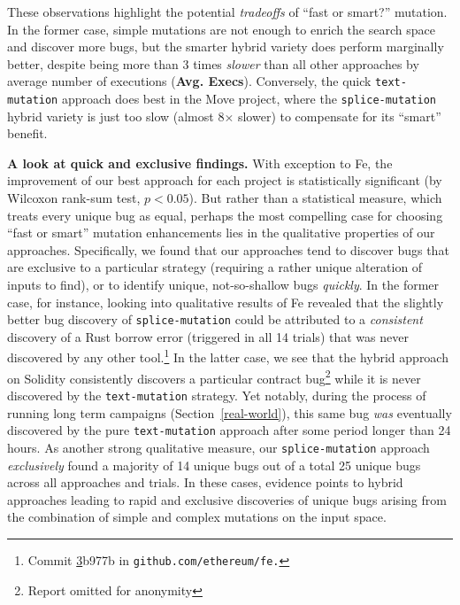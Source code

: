 \begin{sloppypar}
These observations highlight the potential \emph{tradeoffs} of ``fast or
smart?'' mutation. In the former case, simple mutations are not enough to
enrich the search space and discover more bugs, but the smarter hybrid variety
does perform marginally better, despite being more than 3 times \emph{slower}
than all other approaches by average number of executions (\textbf{Avg.
Execs}). Conversely, the quick \texttt{text-mutation} approach does best in the
Move project, where the \texttt{splice-mutation} hybrid variety is just too
slow (almost 8$\times$ slower) to compensate for its ``smart''
benefit.
\end{sloppypar}

\textbf{A look at quick and exclusive findings.} With exception to Fe, the
improvement of our best approach for each project is statistically significant
(by Wilcoxon rank-sum test, $p < 0.05$).  But rather than a statistical
measure, which treats every unique bug as equal, perhaps the most compelling
case for choosing ``fast or smart'' mutation enhancements lies in the
qualitative properties of our approaches. Specifically, we found that our
approaches tend to discover bugs that are exclusive to a particular strategy
(requiring a rather unique alteration of inputs to find), or to identify
unique, not-so-shallow bugs \emph{quickly}. In the former case, for instance,
looking into qualitative results of Fe revealed that the slightly better bug
discovery of \texttt{splice-mutation} could be attributed to a
\emph{consistent} discovery of a Rust borrow error (triggered in all 14 trials)
that was never discovered by any other tool.\footnote{Commit
\href{https://github.com/ethereum/fe/commit/3b977b3078eb163ba521f57d8509e16efdb9dbf4}
3b977b in \texttt{github.com/ethereum/fe.}} In the latter case, we see that the
hybrid approach on Solidity consistently discovers a particular contract
bug\footnote{Report omitted for anonymity} while it is never discovered by the
\texttt{text-mutation} strategy. Yet notably, during the process of running
long term campaigns (Section~\ref{real-world}), this same bug \emph{was}
eventually discovered by the pure \texttt{text-mutation} approach after some
period longer than 24 hours. As another strong qualitative measure, our
\texttt{splice-mutation} approach \emph{exclusively} found a majority of 14
unique bugs out of a total 25 unique bugs across all approaches and trials.  In
these cases, evidence points to hybrid approaches leading to rapid and
exclusive discoveries of unique bugs arising from the combination of simple and
complex mutations on the input space.

